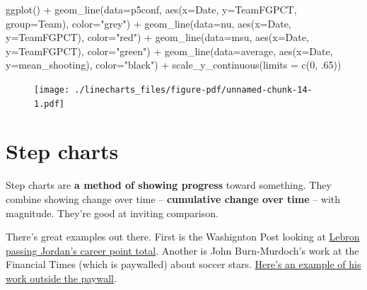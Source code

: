 \documentclass[
  letterpaper,
  DIV=11,
  numbers=noendperiod]{scrreprt}
\newenvironment{Shaded}{\begin{snugshade}}{\end{snugshade}}
\newcommand{\AttributeTok}[1]{\textcolor[rgb]{0.40,0.45,0.13}{#1}}
\newcommand{\DecValTok}[1]{\textcolor[rgb]{0.68,0.00,0.00}{#1}}
\newcommand{\FunctionTok}[1]{\textcolor[rgb]{0.28,0.35,0.67}{#1}}
\newcommand{\NormalTok}[1]{\textcolor[rgb]{0.00,0.23,0.31}{#1}}
\newcommand{\SpecialCharTok}[1]{\textcolor[rgb]{0.37,0.37,0.37}{#1}}
\newcommand{\StringTok}[1]{\textcolor[rgb]{0.13,0.47,0.30}{#1}}
\begin{document}
\begin{Shaded}
\begin{Highlighting}[]
\FunctionTok{ggplot}\NormalTok{() }\SpecialCharTok{+} 
  \FunctionTok{geom\_line}\NormalTok{(}\AttributeTok{data=}\NormalTok{p5conf, }\FunctionTok{aes}\NormalTok{(}\AttributeTok{x=}\NormalTok{Date, }\AttributeTok{y=}\NormalTok{TeamFGPCT, }\AttributeTok{group=}\NormalTok{Team), }\AttributeTok{color=}\StringTok{"grey"}\NormalTok{) }\SpecialCharTok{+} 
  \FunctionTok{geom\_line}\NormalTok{(}\AttributeTok{data=}\NormalTok{nu, }\FunctionTok{aes}\NormalTok{(}\AttributeTok{x=}\NormalTok{Date, }\AttributeTok{y=}\NormalTok{TeamFGPCT), }\AttributeTok{color=}\StringTok{"red"}\NormalTok{) }\SpecialCharTok{+} 
  \FunctionTok{geom\_line}\NormalTok{(}\AttributeTok{data=}\NormalTok{msu, }\FunctionTok{aes}\NormalTok{(}\AttributeTok{x=}\NormalTok{Date, }\AttributeTok{y=}\NormalTok{TeamFGPCT), }\AttributeTok{color=}\StringTok{"green"}\NormalTok{) }\SpecialCharTok{+} 
  \FunctionTok{geom\_line}\NormalTok{(}\AttributeTok{data=}\NormalTok{average, }\FunctionTok{aes}\NormalTok{(}\AttributeTok{x=}\NormalTok{Date, }\AttributeTok{y=}\NormalTok{mean\_shooting), }\AttributeTok{color=}\StringTok{"black"}\NormalTok{) }\SpecialCharTok{+} 
  \FunctionTok{scale\_y\_continuous}\NormalTok{(}\AttributeTok{limits =} \FunctionTok{c}\NormalTok{(}\DecValTok{0}\NormalTok{, .}\DecValTok{65}\NormalTok{))}
\end{Highlighting}
\end{Shaded}

\begin{figure}[H]

{\centering \texttt{[image: ./linecharts\_files/figure-pdf/unnamed-chunk-14-1.pdf]}

}

\end{figure}


\hypertarget{step-charts}{%
\chapter{Step charts}\label{step-charts}}

Step charts are \textbf{a method of showing progress} toward something.
They combine showing change over time -- \textbf{cumulative change over
time} -- with magnitude. They're good at inviting comparison.

There's great examples out there. First is the Washignton Post looking
at
\href{https://www.washingtonpost.com/graphics/sports/lebron-james-michael-jordan-nba-scoring-list/?utm_term=.481074150849}{Lebron
passing Jordan's career point total}. Another is John Burn-Murdoch's
work at the Financial Times (which is paywalled) about soccer stars.
\href{http://johnburnmurdoch.github.io/projects/goal-lines/CL/}{Here's
an example of his work outside the paywall}.
\end{document}
